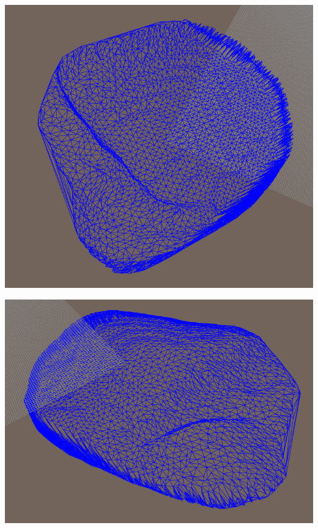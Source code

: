 \documentclass[a4paper, 12pt]{article}   	%
\begin{document}
    \begin{center}
        \begin{minipage}{0.7\linewidth}
            \includegraphics[width=\linewidth]{img/down_view_above_0}
        \end{minipage}
    \end{center}
    \begin{center}
        \begin{minipage}{0.7\linewidth}
            \includegraphics[width=\linewidth]{img/down_view_bottom_0}
        \end{minipage}
    \end{center}
    
\end{document}
